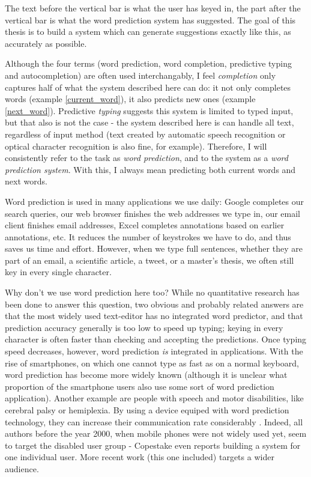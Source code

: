 \documentclass[11pt]{article}
\begin{document}
The text before the vertical bar is what the user has keyed in, the part after the vertical bar is what the word prediction system has suggested. The goal of this thesis is to build a system which can generate suggestions exactly like this, as accurately as possible. 

Although the four terms (word prediction, word completion, predictive typing and autocompletion) are often used interchangably, I feel \emph{completion} only captures half of what the system described here can do: it not only completes words (example \ref{current_word}), it also predicts new ones (example \ref{next_word}). Predictive \emph{typing} suggests this system is limited to typed input, but that also is not the case - the system described here is can handle all text, regardless of input method (text created by automatic speech recognition or optical character recognition is also fine, for example). Therefore, I will consistently refer to the task as \emph{word prediction}, and to the system as a \emph{word prediction system}. With this, I always mean predicting both current words and next words.

Word prediction is used in many applications we use daily: Google completes our search queries, our web browser finishes the web addresses we type in, our email client finishes email addresses, Excel completes annotations based on earlier annotations, etc. It reduces the number of keystrokes we have to do, and thus saves us time and effort. However, when we type full sentences, whether they are part of an email, a scientific article, a tweet, or a master's thesis, we often still key in every single character. 

Why don't we use word prediction here too? While no quantitative research has been done to answer this question, two obvious and probably related answers are that the most widely used text-editor has no integrated word predictor, and that prediction accuracy generally is too low to speed up typing; keying in every character is often faster than checking and accepting the predictions. Once typing speed decreases, however, word prediction \emph{is} integrated in applications. With the rise of smartphones,  on which one  cannot type as fast as on a normal keyboard, word prediction has become more widely known  (although it is unclear what proportion of the smartphone users also use some sort of word prediction application). Another example are  people with speech and motor disabilities, like cerebral palsy or hemiplexia. By using a device equiped with word prediction technology, they can increase their communication rate considerably \cite{Garay-Vitoria+06}. Indeed, all authors before the year 2000, when mobile phones were not widely used yet, seem to target the disabled user group - Copestake  even reports building a system for one individual user. More recent work (this one included) targets a wider audience.
\end{document}
